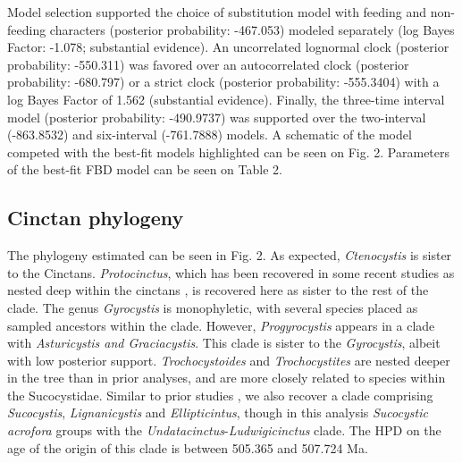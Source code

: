 \documentclass{article}
\begin{document}
Model selection supported the choice of substitution model with feeding and non-feeding characters (posterior probability: -467.053) modeled separately (log Bayes Factor: -1.078; substantial evidence).
An uncorrelated lognormal clock (posterior probability: -550.311) was favored over an autocorrelated clock (posterior probability: -680.797) or a strict clock (posterior probability: -555.3404) with a log Bayes Factor of 1.562 (substantial evidence).
Finally, the three-time interval model (posterior probability: -490.9737) was supported over the two-interval (-863.8532) and six-interval (-761.7888) models. 
A schematic of the model competed with the best-fit models highlighted can be seen on Fig. 2.
Parameters of the best-fit FBD model can be seen on Table 2.

\subsection{Cinctan phylogeny}

The phylogeny estimated can be seen in Fig. 2.
As expected, \textit{Ctenocystis} is sister to the Cinctans. 
\textit{Protocinctus}, which has been recovered in some recent studies as nested deep within the cinctans \citep{SmithZamora2009}, is recovered here as sister to the rest of the clade. 
The genus \textit{Gyrocystis} is monophyletic, with several species placed as sampled ancestors within the clade. 
However, \textit{Progyrocystis} appears in a clade with \textit{Asturicystis and Graciacystis}. 
This clade is sister to the \textit{Gyrocystis}, albeit with low posterior support. 
\textit{Trochocystoides} and \textit{Trochocystites} are nested deeper in the tree than in prior analyses, and are more closely related to species within the Sucocystidae.
Similar to prior studies \citep{SmithZamora2009,ZamoraRahmanSmith2013}, we also recover a clade comprising \textit{Sucocystis}, \textit{Lignanicystis} and \textit{Ellipticintus}, though in this analysis \textit{Sucocystic acrofora} groups with the \textit{Undatacinctus}-\textit{Ludwigicinctus} clade.
The HPD on the age of the origin of this clade is between 505.365 and 507.724 Ma.
\end{document}
